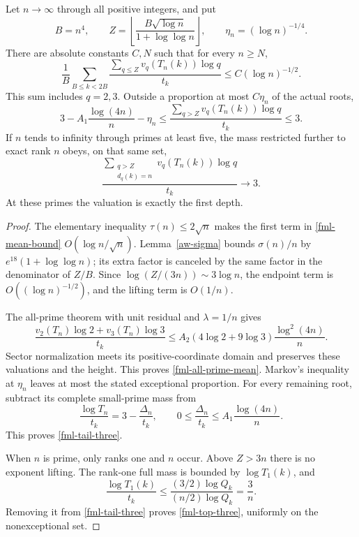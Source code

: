 \begin{theorem}
\label{fml-concentration}
Let $n\to\infty$ through all positive integers, and put
\[
 B=n^4,\qquad
 Z=\left\lfloor\frac{B\sqrt{\log n}}{1+\log\log n}\right\rfloor,
 \qquad \eta_n=(\log n)^{-1/4}.
\]
There are absolute constants $C,N$ such that for every $n\ge N$,
\begin{equation}\label{fml-all-prime-mean}
 \frac1B\sum_{B\le k<2B}
    \frac{\displaystyle\sum_{q\le Z}v_q(T_n(k))\log q}{t_k}
 \le C(\log n)^{-1/2}.
\end{equation}
This sum includes $q=2,3$. Outside a proportion at most $C\eta_n$
of the actual roots,
\begin{equation}\label{fml-tail-three}
 3-A_1\frac{\log(4n)}n-\eta_n
 \le\frac{\displaystyle\sum_{q>Z}v_q(T_n(k))\log q}{t_k}
 \le3.
\end{equation}
If $n$ tends to infinity through primes at least five, the mass
restricted further to exact rank $n$ obeys, on that same set,
\begin{equation}\label{fml-top-three}
 \frac{\displaystyle\sum_{\substack{q>Z\\d_q(k)=n}}
                    v_q(T_n(k))\log q}{t_k}\longrightarrow3.
\end{equation}
At these primes the valuation is exactly the first depth.
\end{theorem}
\begin{proof}
The elementary inequality $\tau(n)\le2\sqrt n$ makes the first
term in \eqref{fml-mean-bound} $O(\log n/\sqrt n)$.
Lemma~\ref{aw-sigma} bounds $\sigma(n)/n$ by
$e^{18}(1+\log\log n)$; its extra factor is canceled by the same
factor in the denominator of $Z/B$. Since
$\log(Z/(3n))\sim3\log n$, the endpoint term is
$O((\log n)^{-1/2})$, and the lifting term is $O(1/n)$.

The all-prime theorem with unit residual and $\lambda=1/n$ gives
\[
 \frac{v_2(T_n)\log2+v_3(T_n)\log3}{t_k}
 \le A_2(4\log2+9\log3)\frac{\log^2(4n)}n.
\]
Sector normalization meets its positive-coordinate domain and preserves
these valuations and the height. This proves
\eqref{fml-all-prime-mean}. Markov's inequality at $\eta_n$ leaves
at most the stated exceptional proportion. For every remaining root,
subtract its complete small-prime mass from
\[
 \frac{\log T_n}{t_k}=3-\frac{\Delta_n}{t_k},\qquad
 0\le\frac{\Delta_n}{t_k}\le A_1\frac{\log(4n)}n.
\]
This proves \eqref{fml-tail-three}.

When $n$ is prime, only ranks one and $n$ occur. Above $Z>3n$
there is no exponent lifting. The rank-one full mass is bounded by
$\log T_1(k)$, and
\[
 \frac{\log T_1(k)}{t_k}
 \le\frac{(3/2)\log Q_k}{(n/2)\log Q_k}=\frac3n.
\]
Removing it from \eqref{fml-tail-three} proves
\eqref{fml-top-three}, uniformly on the nonexceptional set.
\end{proof}

